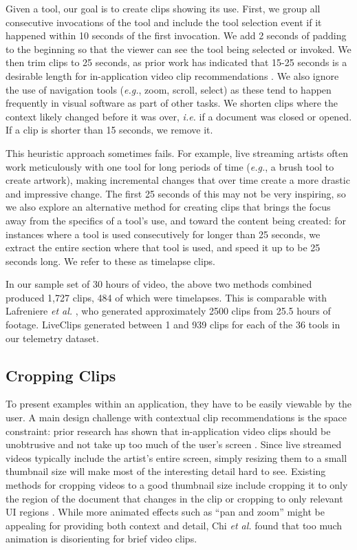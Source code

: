 Given a tool, our goal is to create clips showing its use. First, we group all consecutive invocations of the tool and include the tool selection event if it happened within 10 seconds of the first invocation. We add 2 seconds of padding to the beginning so that the viewer can see the tool being selected or invoked. We then trim clips to 25 seconds, as prior work has indicated that 15-25 seconds is a desirable length for in-application video clip recommendations \cite{Lafreniere2014}. We also ignore the use of navigation tools (\textit{e.g.}, zoom, scroll, select) as these tend to happen frequently in visual software as part of other tasks. We shorten clips where the context likely changed before it was over, \textit{i.e.} if a document was closed or opened. If a clip is shorter than 15 seconds, we remove it.

This heuristic approach sometimes fails. For example, live streaming artists often work meticulously with one tool for long periods of time (\textit{e.g.}, a brush tool to create artwork), making incremental changes that over time create a more drastic and impressive change. The first 25 seconds of this may not be very inspiring, so we also explore an alternative method for creating clips that brings the focus away from the specifics of a tool's use, and toward the content being created: for instances where a tool is used consecutively for longer than 25 seconds, we extract the entire section where that tool is used, and speed it up to be 25 seconds long. We refer to these as timelapse clips.

In our sample set of 30 hours of video, the above two methods combined produced 1,727 clips, 484 of which were timelapses. This is comparable with Lafreniere \textit{et al.} \cite{Lafreniere2014}, who generated approximately 2500 clips from 25.5 hours of footage. LiveClips generated between 1 and 939 clips for each of the 36 tools in our telemetry dataset.

\subsection{Cropping Clips}
To present examples within an application, they have to be easily viewable by the user. A main design challenge with contextual clip recommendations is the space constraint: prior research has shown that in-application video clips should be unobtrusive and not take up too much of the user's screen \cite{Grossman2010a}. Since live streamed videos typically include the artist's entire screen, simply resizing them to a small thumbnail size will make most of the interesting detail hard to see. Existing methods for cropping videos to a good thumbnail size include cropping it to only the region of the document that changes in the clip \cite{Grossman2010} or cropping to only relevant UI regions \cite{Chi2012}. While more animated effects such as ``pan and zoom'' might be appealing for providing both context and detail, Chi \textit{et al.} \cite{Chi2012} found that too much animation is disorienting for brief video clips.

